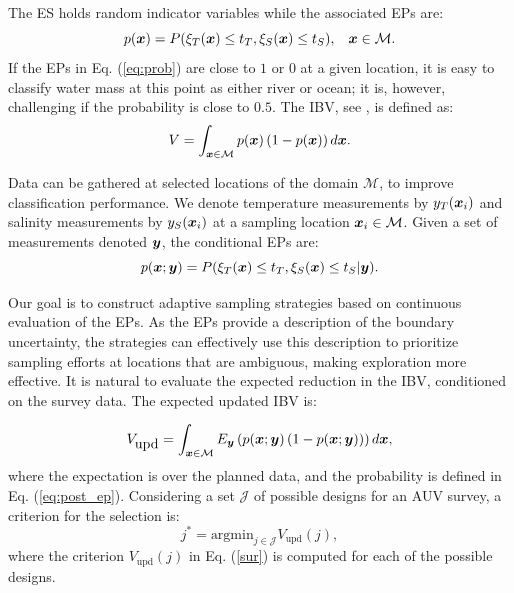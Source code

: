 \documentclass[aoas]{imsart}
\begin{document}
The ES holds random indicator variables while the associated EPs are: 
\begin{equation}\label{eq:prob}
  p(\bx) = P(\xi_T(\bx) \leq t_T, \xi_S(\bx) \leq t_S), \hspace{3mm} \bx \in \mathcal{M}.
\end{equation}
If the EPs in Eq. (\ref{eq:prob}) are
close to $1$ or $0$ at a given location, it is easy to classify water mass at this point as either river or ocean; it is, however,
challenging if the probability is close to $0.5$. 
The IBV, see \cite{bect2019}, is defined as:
\begin{equation}\label{measVAR}
    V = \int_{\bx \in \mathcal{M}} p(\bx) \left(1-p(\bx)\right) d\bx.
\end{equation}

Data can be
gathered at selected locations of the domain $\mathcal{M}$, to improve
classification performance. We denote temperature measurements by
$y_{T}({\boldsymbol x}_i)$ and salinity measurements by $y_{S}({\boldsymbol x}_i)$ at a
sampling location ${\boldsymbol x}_i \in \mathcal{M}$. Given a set of
measurements denoted ${\boldsymbol y}$, the conditional EPs are:
\begin{equation}\label{eq:post_ep}
 p(\bx;\by) = P(\xi_T(\bx) \leq t_T, \xi_S(\bx) \leq t_S |\by). 
\end{equation}

Our goal is to construct adaptive sampling strategies based on
continuous evaluation of the EPs. As the EPs provide a description of
the boundary uncertainty, the strategies can effectively use this
description to prioritize sampling efforts at locations that are
ambiguous, making exploration more effective. It is natural to
evaluate the expected reduction in the IBV, conditioned on the survey
data. The expected updated IBV is:

\begin{equation}\label{sur}
    V_{\mbox{upd}} = \int_{\bx \in \mathcal{M}} E_{\by} \left( p(\bx;\by)\left( 1-p(\bx;\by)\right) \right) d\bx, 
\end{equation}
where the expectation is over the planned data, and the probability is
defined in Eq. (\ref{eq:post_ep}).  Considering a set $\mathcal{J}$ of
possible designs for an AUV survey, a criterion for the selection is:
\begin{equation}\label{crit}
    j^* = \mbox{argmin}_{j \in \mathcal{J}} V_{\mbox{upd}}(j),
\end{equation}
where the criterion $V_{\mbox{upd}}(j)$ in Eq. (\ref{sur}) is computed
for each of the possible designs. 
\end{document}
